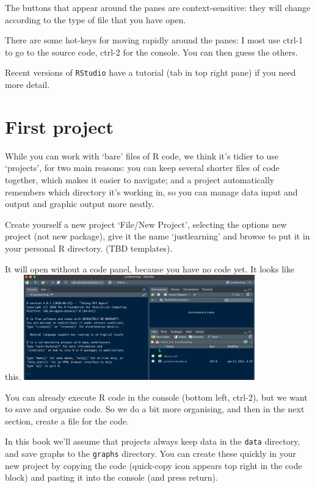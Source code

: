 \documentclass[
]{book}
\begin{document}
The buttons that appear around the panes are context-sensitive: they will change according to the type of file that you have open.

There are some hot-keys for moving rapidly around the panes: I most use ctrl-1 to go to the source code, ctrl-2 for the console. You can then guess the others.

Recent versions of \texttt{RStudio} have a tutorial (tab in top right pane) if you need more detail.

\hypertarget{first-project}{%
\section{First project}\label{first-project}}

While you can work with `bare' files of R code, we think it's tidier to use `projects', for two main reasons: you can keep several shorter files of code together, which makes it easier to navigate; and a project automatically remembers which directory it's working in, so you can manage data input and output and graphic output more neatly.

Create yourself a new project `File/New Project', selecting the options new project (not new package), give it the name `justlearning' and browse to put it in your personal R directory. (TBD templates).

It will open without a code panel, because you have no code yet. It looks like this.
\includegraphics[width=0.75\textwidth,height=\textheight]{images/NewJustLearning.png}

You can already execute R code in the console (bottom left, ctrl-2), but we want to save and organise code. So we do a bit more organising, and then in the next section, create a file for the code.

In this book we'll assume that projects always keep data in the \texttt{data} directory, and save graphs to the \texttt{graphs} directory. You can create these quickly in your new project by copying the code (quick-copy icon appears top right in the code block) and pasting it into the console (and press return).
\end{document}

